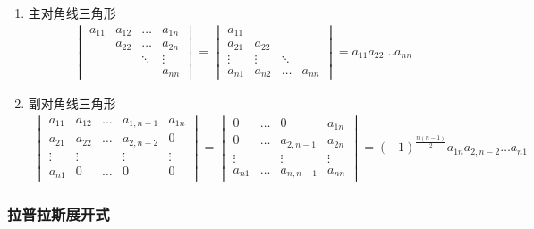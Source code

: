 \documentclass[a4paper,12pt]{article}
\begin{document}
    \begin{enumerate}
        \item 主对角线三角形
        \begin{align*}
            \begin{vmatrix}
                a_{11} & a_{12} & \dots  & a_{1n} \\
                & a_{22} & \dots  & a_{2n} \\
                &        & \ddots & \vdots \\
                &        &        & a_{nn}
            \end{vmatrix}
            = \begin{vmatrix}
                  a_{11} &        &        &        \\
                  a_{21} & a_{22} &        &        \\
                  \vdots & \vdots & \ddots &        \\
                  a_{n1} & a_{n2} & \dots  & a_{nn}
            \end{vmatrix}
            = a_{11}a_{22}\dots a_{nn}
        \end{align*}
        \item 副对角线三角形
        \begin{align*}
            \begin{vmatrix}
                a_{11} & a_{12} & \dots & a_{1,n-1} & a_{1n} \\
                a_{21} & a_{22} & \dots & a_{2,n-2} & 0      \\
                \vdots & \vdots &       & \vdots    & \vdots \\
                a_{n1} & 0      & \dots & 0         & 0
            \end{vmatrix}
            = \begin{vmatrix}
                  0      & \dots & 0         & a_{1n} \\
                  0      & \dots & a_{2,n-1} & a_{2n} \\
                  \vdots &       & \vdots    & \vdots \\
                  a_{n1} & \dots & a_{n,n-1} & a_{nn}
            \end{vmatrix}
            = (-1)^{\frac{n(n-1)}{2}}a_{1n}a_{2,n-2}\dots a_{n1}
        \end{align*}
    \end{enumerate}

    \subsubsection{拉普拉斯展开式}
\end{document}

